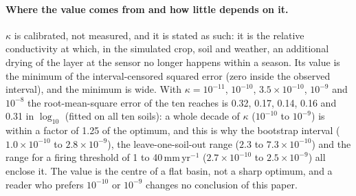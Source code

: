 \paragraph{Where the value comes from and how little depends on it.}
$\kappa$ is calibrated, not measured, and it is stated as such: it is the relative conductivity at which, in the simulated crop, soil and weather, an additional drying of the layer at the sensor no longer happens within a season. Its value is the minimum of the interval-censored squared error (zero inside the observed interval), and the minimum is wide. With $\kappa=10^{-11}$, $10^{-10}$, $3.5\times10^{-10}$, $10^{-9}$ and $10^{-8}$ the root-mean-square error of the ten reaches is 0.32, 0.17, 0.14, 0.16 and 0.31 in $\log_{10}$ (fitted on all ten soils): a whole decade of $\kappa$ ($10^{-10}$ to $10^{-9}$) is within a factor of 1.25 of the optimum, and this is why the bootstrap interval ($1.0\times10^{-10}$ to $2.8\times10^{-9}$), the leave-one-soil-out range ($2.3$ to $7.3\times10^{-10}$) and the range for a firing threshold of 1 to 40\,mm\,yr$^{-1}$ ($2.7\times10^{-10}$ to $2.5\times10^{-9}$) all enclose it. The value is the centre of a flat basin, not a sharp optimum, and a reader who prefers $10^{-10}$ or $10^{-9}$ changes no conclusion of this paper.

